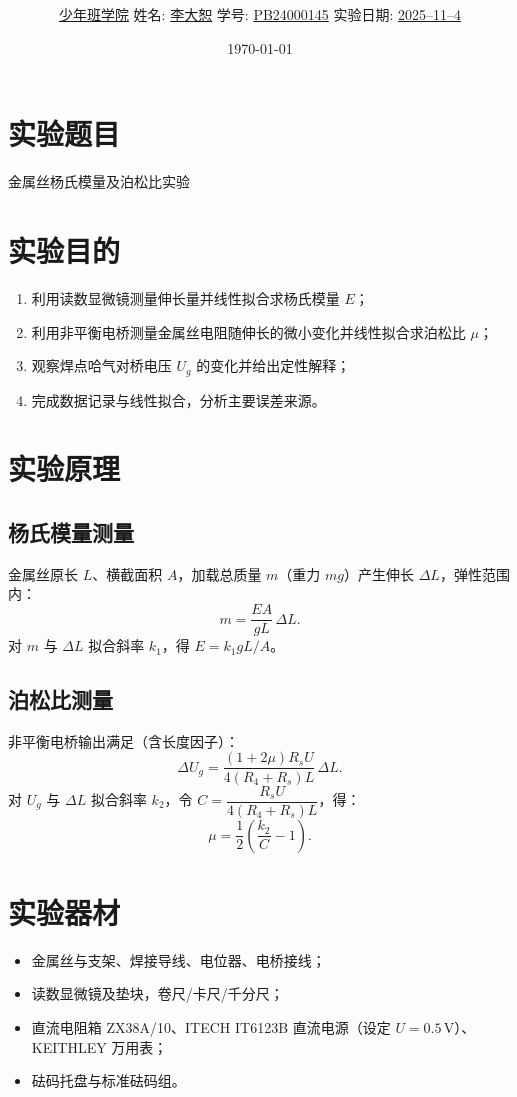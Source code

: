 \documentclass[12pt,a4paper]{article}
\title{\Huge{\textbf{\uuline{实\ 验\ 报\ 告}}}}
\author{\uline{少年班学院} \quad 姓名: \uline{李大恕} \quad 学号: \uline{PB24000145} \quad 实验日期: \uline{2025--11--4}}
\date{\today}
\begin{document}
\maketitle

\section{实验题目}
金属丝杨氏模量及泊松比实验

\section{实验目的}
\begin{enumerate}
    \item 利用读数显微镜测量伸长量并线性拟合求杨氏模量 $E$；
    \item 利用非平衡电桥测量金属丝电阻随伸长的微小变化并线性拟合求泊松比 $\mu$；
    \item 观察焊点哈气对桥电压 $U_g$ 的变化并给出定性解释；
    \item 完成数据记录与线性拟合，分析主要误差来源。 
\end{enumerate}

\section{实验原理}
\subsection{杨氏模量测量}
金属丝原长 $L$、横截面积 $A$，加载总质量 $m$（重力 $mg$）产生伸长 $\Delta L$，弹性范围内：
\[ m = \frac{E A}{g L}\,\Delta L. \]
对 $m$ 与 $\Delta L$ 拟合斜率 $k_1$，得 $E = k_1 g L/A$。
\subsection{泊松比测量}
非平衡电桥输出满足（含长度因子）：
\[ \Delta U_g = \frac{(1+2\mu) R_s U}{4(R_4+R_s) L}\,\Delta L. \]
对 $U_g$ 与 $\Delta L$ 拟合斜率 $k_2$，令 $C=\dfrac{R_s U}{4(R_4+R_s) L}$，得：
\[ \mu = \frac{1}{2}\left(\frac{k_2}{C}-1\right). \]

\section{实验器材}
\begin{itemize}
    \item 金属丝与支架、焊接导线、电位器、电桥接线；
    \item 读数显微镜及垫块，卷尺/卡尺/千分尺；
    \item 直流电阻箱 ZX38A/10、ITECH IT6123B 直流电源（设定 $U=0.5\,\mathrm{V}$）、KEITHLEY 万用表；
    \item 砝码托盘与标准砝码组。
\end{itemize}
\end{document}
